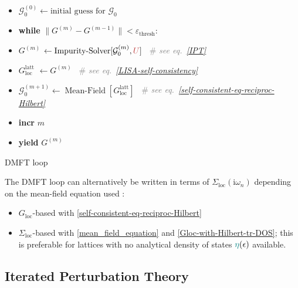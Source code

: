 \documentclass[reprint,amsmath,amssymb,aps,pra]{revtex4-2}
\newcommand{\iwn}{\mathrm{i}\omega_n}
\begin{document}
\begin{algorithm}[H]
\begin{itemize}
\setlength\itemsep{0em}
    \item[] $\mathcal{G}_0^{(0)} \gets \text{initial guess for }\mathcal{G}_0$
    \item[] \textbf{while} $\| G^{(m)} - G^{\left( m-1 \right)} \| <
\varepsilon_{\text{thresh}}$:
    \item[] \hspace{2em} $G^{(m)}$ \hspace{0.4em} $\gets \operatorname{Impurity-Solver}[\mathcal{G}_0^{(m)}, {\color[HTML]{BF4040}U}]$ \textcolor{gray}{\ \# \textit{see eq.~\eqref{IPT}}}
    \item[] \hspace{2em} $G_{\text{loc}}^{\text{latt}}$ \hspace{0.5em} $\gets G^{(m)}$ \textcolor{gray}{\ \# \textit{see eq.~\eqref{LISA-self-consistency}}}
    \item[] \hspace{2em} $\mathcal{G}_0^{(m + 1)} \gets  \operatorname{Mean-Field}[G_{\text{loc}}^{\text{latt}}]$ \textcolor{gray}{\ \# \textit{see eq.~\eqref{self-consistent-eq-reciproc-Hilbert}}}
    \item[] \hspace{2em} \textbf{incr} $m$
    \item[] \textbf{yield} $G^{(m)}$
\end{itemize}
\caption{DMFT loop}\label{DMFT-loop}
\end{algorithm}

The DMFT loop can alternatively be written in terms of $\Sigma_\text{loc}(\iwn)$ depending on the mean-field equation used :
\begin{itemize}\setlength\itemsep{0em}
    \item $G_\text{loc}$-based with \eqref{self-consistent-eq-reciproc-Hilbert}
    \item $\Sigma_\text{loc}$-based with \eqref{mean_field_equation} and \eqref{Gloc-with-Hilbert-tr-DOS}; this is preferable for lattices with no analytical density of states ${\color[HTML]{008080}\eta}(\epsilon)$ available.
\end{itemize}

\subsection{Iterated Perturbation Theory}
\end{document}
